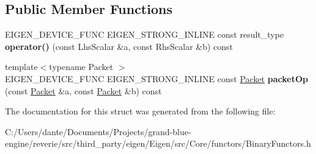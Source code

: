\subsection*{Public Member Functions}
\begin{DoxyCompactItemize}
\item 
\mbox{\label{struct_eigen_1_1internal_1_1scalar__conj__product__op_a231f27811a0115efbb9799ca72b81191}} 
E\+I\+G\+E\+N\+\_\+\+D\+E\+V\+I\+C\+E\+\_\+\+F\+U\+NC E\+I\+G\+E\+N\+\_\+\+S\+T\+R\+O\+N\+G\+\_\+\+I\+N\+L\+I\+NE const result\+\_\+type {\bfseries operator()} (const Lhs\+Scalar \&a, const Rhs\+Scalar \&b) const
\item 
\mbox{\label{struct_eigen_1_1internal_1_1scalar__conj__product__op_af1d1984fdb063915397987b4859b0ee7}} 
{\footnotesize template$<$typename Packet $>$ }\\E\+I\+G\+E\+N\+\_\+\+D\+E\+V\+I\+C\+E\+\_\+\+F\+U\+NC E\+I\+G\+E\+N\+\_\+\+S\+T\+R\+O\+N\+G\+\_\+\+I\+N\+L\+I\+NE const \mbox{\hyperlink{union_eigen_1_1internal_1_1_packet}{Packet}} {\bfseries packet\+Op} (const \mbox{\hyperlink{union_eigen_1_1internal_1_1_packet}{Packet}} \&a, const \mbox{\hyperlink{union_eigen_1_1internal_1_1_packet}{Packet}} \&b) const
\end{DoxyCompactItemize}


The documentation for this struct was generated from the following file\+:\begin{DoxyCompactItemize}
\item 
C\+:/\+Users/dante/\+Documents/\+Projects/grand-\/blue-\/engine/reverie/src/third\+\_\+party/eigen/\+Eigen/src/\+Core/functors/Binary\+Functors.\+h\end{DoxyCompactItemize}
